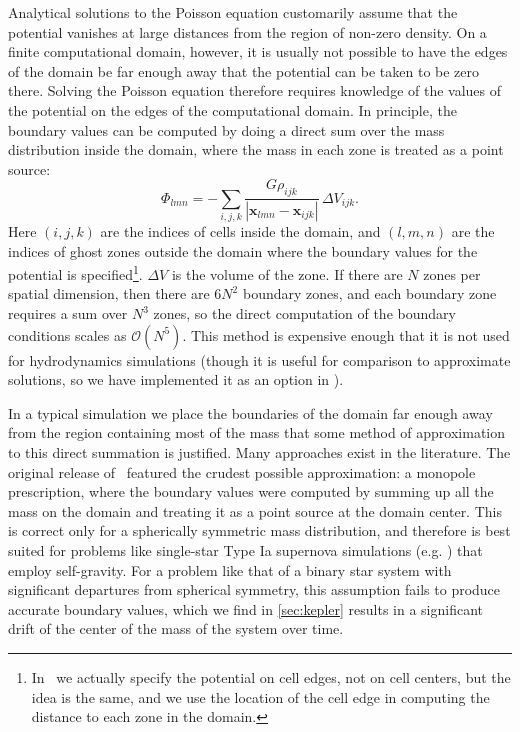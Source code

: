 \documentclass[12pt]{article}
\begin{document}
Analytical solutions to the Poisson equation customarily assume that the
potential vanishes at large distances from the region of non-zero
density. On a finite computational domain, however, it is usually not
possible to have the edges of the domain be far enough away that the
potential can be taken to be zero there. Solving the Poisson equation
therefore requires knowledge of the values of the potential on the
edges of the computational domain. In principle, the boundary values can be computed
by doing a direct sum over the mass distribution inside the domain,
where the mass in each zone is treated as a point source:
\begin{equation}
  \Phi_{{lmn}} = -\sum_{{i, j, k}} \frac{G \rho_{{ijk}}}{|\mathbf{x}_{{lmn}} - \mathbf{x}_{{ijk}}|}\, \Delta V_{{ijk}}.\label{eq:direct_sum}
\end{equation}
Here $(i, j, k)$ are the indices of cells inside the domain, and $(l,m, n)$
are the indices of ghost zones outside the domain where the boundary values for the potential is specified\footnote{In \castro\ we actually
specify the potential on cell edges, not on cell centers, but the idea is the same, and we use the location of
the cell edge in computing the distance to each zone in the domain.}. $\Delta V$ is the volume of the
zone. If there are $N$ zones per spatial dimension, then there are
$6 N^2$ boundary zones, and each boundary zone requires a sum over
$N^3$ zones, so the direct computation of the boundary conditions
scales as $\mathcal{O}(N^5)$.  This method is expensive enough that it is not used
for hydrodynamics simulations (though it is useful for comparison to
approximate solutions, so we have implemented it as an option in \castro).

In a typical simulation we place the boundaries of the domain far
enough away from the region containing most of the mass that some
method of approximation to this direct summation is justified. Many
approaches exist in the literature. The original release of \castro\
featured the crudest possible approximation: a monopole prescription,
where the boundary values were computed by summing up all the mass on
the domain and treating it as a point source at the domain
center. This is correct only for a spherically symmetric mass
distribution, and therefore is best suited for problems like
single-star Type Ia supernova simulations (e.g. \citealt{malone:2014})
that employ self-gravity. For a problem like that of a binary star system
with significant departures from spherical symmetry, this assumption
fails to produce accurate boundary values, which we find in \autoref{sec:kepler}
results in a significant drift of the center of the mass of the system over time.
\end{document}
